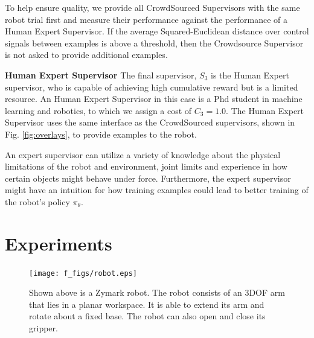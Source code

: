 \documentclass[10pt, conference]{ieeeconf}      %
\begin{document}
To help ensure quality, we provide all CrowdSourced Supervisors with the same robot trial first and measure their
performance against the performance of a Human Expert Supervisor. If the average Squared-Euclidean distance over control
signals between examples is above a threshold, then the Crowdsource Supervisor is not asked to provide additional examples.

\noindent \textbf{Human Expert Supervisor} The final supervisor, $S_3$ is the Human Expert supervisor, who is capable of
achieving high cumulative reward but is a limited resource. An Human Expert Supervisor in this case is a Phd student in
machine learning and robotics, to which we assign a cost of $C_3=1.0$. The Human Expert Supervisor uses the same
interface as the CrowdSourced supervisors, shown in Fig. \ref{fig:overlays}, to provide examples to the robot.  

An expert supervisor can utilize a variety of knowledge about the physical limitations of the robot and environment,
joint limits and experience in how certain objects might behave under force. Furthermore, the expert supervisor might
have an intuition for how training examples could lead to better training of the robot's policy $\pi_\theta$. 


\section{Experiments} \label{sec:Exp}
\begin{figure}[t]
\centering

\texttt{[image: f\_figs/robot.eps]}

\caption{\footnotesize  Shown above is a Zymark robot. The robot consists of an 3DOF arm that lies in a planar workspace. It is able to extend its arm and rotate about a fixed base. The robot can also open and close its gripper.}

\label{fig:robot}
\end{figure}
\end{document}
